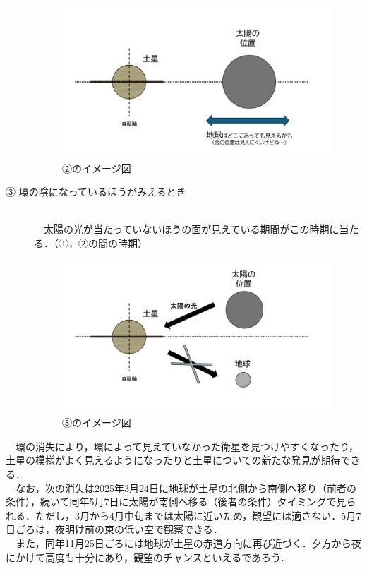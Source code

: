 \documentclass[../main]{subfiles}
\begin{document}
\begin{description}
   \begin{figure}[H]
    \centering
    \includegraphics[width=14cm]{sections/kurahara/部誌用/スライド2.JPG}
    \caption{②のイメージ図}
\end{figure}

    \item [③ 環の陰になっているほうがみえるとき]\mbox{}\\
    　太陽の光が当たっていないほうの面が見えている期間がこの時期に当たる．（①，②の間の時期）
       \begin{figure}[H]
    \centering
    \includegraphics[width=14cm]{sections/kurahara/部誌用/スライド4.JPG}
    \caption{③のイメージ図}
\end{figure}
\end{description}


　環の消失により，環によって見えていなかった衛星を見つけやすくなったり，土星の模様がよく見えるようになったりと土星についての新たな発見が期待できる．\\
　なお，次の消失は2025年3月24日に地球が土星の北側から南側へ移り（前者の条件），続いて同年5月7日に太陽が南側へ移る（後者の条件）タイミングで見られる．ただし，3月から4月中旬までは太陽に近いため，観望には適さない．5月7日ごろは，夜明け前の東の低い空で観察できる．\\
　また，同年11月25日ごろには地球が土星の赤道方向に再び近づく．夕方から夜にかけて高度も十分にあり，観望のチャンスといえるであろう．
\end{document}
